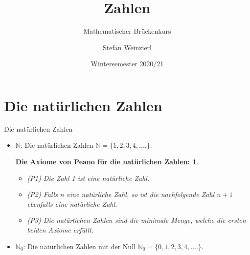 \documentclass[german]{beamer}
\title{Zahlen}
\subtitle{Mathematischer Br\"uckenkurs}
\author{Stefan Weinzierl}
\institute[Uni Mainz]{Institut f\"ur Physik, Universit\"at Mainz}%
\date[WiSe 2020/21]{Wintersemester 2020/21}
\newtheorem*{mytheorem1}{Die {\bf Axiome von Peano} f\"ur die nat\"urlichen Zahlen:}
\begin{document}

\begin{frame}
  \titlepage
\end{frame}


\section{Die nat\"urlichen Zahlen}

\frame{\sectionpage}

\begin{frame}{Die nat\"urlichen Zahlen}

\begin{itemize}
\item \alert{${\mathbb N}$}: Die nat\"urlichen Zahlen ${\mathbb N} = \{1,2,3,4,....\}$.

\begin{mytheorem1}
\begin{itemize}
\item (P1) Die Zahl 1 ist eine nat\"urliche Zahl.
\item (P2) Falls $n$ eine nat\"urliche Zahl, so ist die nachfolgende Zahl $n+1$ ebenfalls eine 
nat\"urliche Zahl.
\item (P3) Die nat\"urlichen Zahlen sind die minimale Menge, welche die ersten beiden Axiome erf\"ullt.
\end{itemize}
\end{mytheorem1}

\item \alert{${\mathbb N}_0$}: Die nat\"urlichen Zahlen mit der Null ${\mathbb N}_0 = \{0,1,2,3,4,....\}$.
\end{itemize}

\end{frame}
\end{document}
